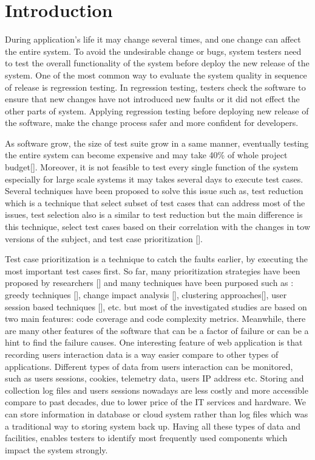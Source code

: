 \section{Introduction}
\label{sec:introduction}
During application's life it may change several times, and one change can affect the entire system.
To avoid the undesirable change or bugs, system testers need to  
test the overall functionality of the system before deploy the new release of the system.
One of the most common way to evaluate the system quality in sequence of release is regression testing.
In regression testing, testers check the software to ensure that new changes have not 
introduced new faults or it did not effect the other parts of system.
Applying regression testing before deploying new release of the software, make the 
change process safer and more confident for developers.

As software grow, the size of test suite grow in a same
manner, eventually testing the entire system can become expensive and may take
40\% of whole project budget[].  Moreover, it is not feasible to test every single 
function of the system especially for large scale systems it may takes several days 
to execute test cases. Several techniques have been proposed to solve this issue 
such as, test reduction which is a 
technique that select subset of test cases that can address most of the issues, 
test selection also is a similar to test reduction but the main difference is 
this technique, select test cases based on their correlation with the changes 
in tow versions of the subject, and test case prioritization [].

Test case prioritization is a technique to catch the faults earlier, 
by executing the most important test cases first.
So far, many prioritization strategies have been proposed by researchers [] and
many techniques have been purposed such as : greedy techniques [], change impact analysis [],
clustering approaches[], user session based techniques [], etc. 
but most of the investigated studies are based on two main features: code coverage and 
code complexity metrics. Meanwhile, there are many other features of the software 
that can be a factor of failure or can be a hint to find the failure causes. 
One interesting feature of web application is that recording users interaction data
is a way easier compare to other types of applications. 
Different types of data from users interaction can be
monitored, such as users sessions, cookies, telemetry data, users IP address etc. 
Storing and collection log files and users sessions nowadays are less costly and more 
accessible compare to past decades, due to lower price of the IT services and hardware.
We can store information in database or cloud system 
rather than log files which was a traditional way to storing system back up. 
Having all these types of data and facilities, enables testers to identify most frequently used
components which impact the system strongly. 

